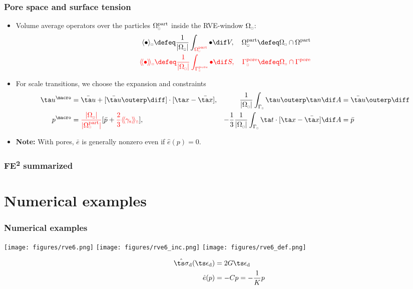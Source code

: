 \documentclass[11pt]{beamer} %
\newcommand{\highlight}[1]{{\color{red}#1}}
\DeclarePairedDelimiter{\homgen}{\langle}{\rangle_\rve}
\DeclarePairedDelimiter{\shomgen}{\langle\!\langle}{\rangle\!\rangle_\rve}
\renewcommand{\dev}{\mathrm{d}}
\newcommand{\volume}{|\Omega_\rve|}
\newcommand{\surf}{\mathrm{s}}
\newcommand{\pore}{\mathrm{pore}}
\newcommand{\particle}{\mathrm{part}}
\newcommand{\rve}{
  {\mathchoice
   {\mbox{\scalebox{0.67}{$\Box$}}}
   {\mbox{\scalebox{0.67}{$\Box$}}}
   {\mbox{\scalebox{0.5}{$\Box$}}}
   {\mbox{\scalebox{0.375}{$\Box$}}}
  }
}
\renewcommand{\alert}[1]{\textbf{#1}}
\begin{document}
\begin{frame}
 \frametitle{Pore space and surface tension}
\begin{itemize}
 \item Volume average operators over the particles $\Omega_\rve^\particle$ inside the RVE-window $\Omega_\rve$:
\begin{align*}
 \homgen{\bullet} \defeq \frac{1}{\volume} \int_{\highlight{\Omega_\rve^\particle}} \bullet \dif V,\quad \Omega_\rve^\particle \defeq \Omega_\rve \cap \Omega^\particle
 \\
 \highlight{\shomgen{\bullet} \defeq \frac{1}{\volume} \int_{\Gamma^\pore_\rve} \bullet \dif S,\quad \Gamma^\pore_\rve \defeq \Omega_\rve \cap \Gamma^\pore}
\end{align*}
 \item For scale transitions, we choose the expansion and constraints
 \begin{align*}
  \ta u^\macro &= \bar{\ta u} + [\bar{\ta u} \outerp\diff] \cdot [\ta x - \bar{\ta x}], &\frac{1}{\volume} \int_{\Gamma_\rve} \ta u \outerp \ta n \dif A &= \bar{\ta u}\outerp\diff
   \\
  p^\macro &= \highlight{\frac{\volume}{|\Omega_\rve^\particle|}} [\bar{p} + \highlight{\frac23\shomgen{\gamma_\surf}}], & -\frac13\frac{1}{\volume} \int_{\Gamma_\rve} \ta t \cdot [\ta x - \bar{\ta x}] \dif A &= \bar{p}
 \end{align*}
 \item \alert{Note:} With pores, $\bar{e}$ is generally nonzero even if $\hat{e}(p) = 0$.
\end{itemize}
\end{frame}

\begin{frame}
 \frametitle{FE\textsuperscript{2} summarized}
\begin{center}
 
\end{center}
\end{frame}

\section{Numerical examples}
\begin{frame}
 \frametitle{Numerical examples}
\begin{center}
 \hspace{1cm}
 \texttt{[image: figures/rve6.png]}
 \texttt{[image: figures/rve6\_inc.png]}
 \texttt{[image: figures/rve6\_def.png]}
\end{center}
 \begin{align*}
  \hat{\ts\sigma}_\dev(\ts\epsilon_\dev) &= 2 G \ts\epsilon_\dev
\\
  \hat{e}(p) &= -C p = -\frac{1}{K} p
 \end{align*}
\end{frame}
\end{document}
